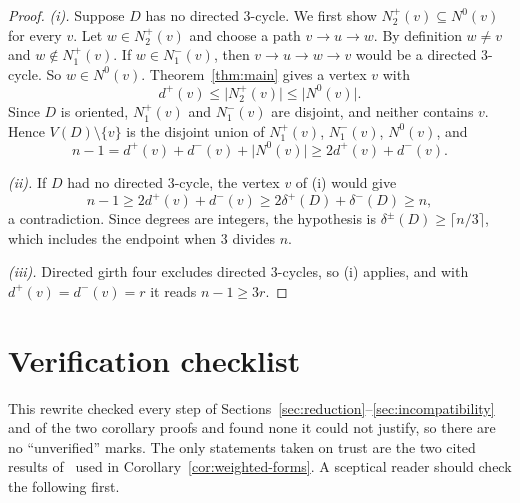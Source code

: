 \documentclass[11pt]{article}
\theoremstyle{remark}
\newcommand{\abs}[1]{\lvert #1\rvert}
\begin{document}
\begin{proof}
\emph{\textup{(i)}.} Suppose $D$ has no directed $3$-cycle. We first show
$N_2^+(v)\subseteq N^0(v)$ for every $v$. Let $w\in N_2^+(v)$ and choose a
path $v\to u\to w$. By definition $w\neq v$ and $w\notin N_1^+(v)$. If
$w\in N_1^-(v)$, then $v\to u\to w\to v$ would be a directed $3$-cycle. So
$w\in N^0(v)$. Theorem~\ref{thm:main} gives a vertex $v$ with
\[
 d^+(v)\leq\abs{N_2^+(v)}\leq\abs{N^0(v)}.
\]
Since $D$ is oriented, $N_1^+(v)$ and $N_1^-(v)$ are disjoint, and neither
contains $v$. Hence $V(D)\setminus\{v\}$ is the disjoint union of
$N_1^+(v)$, $N_1^-(v)$, $N^0(v)$, and
\[
 n-1=d^+(v)+d^-(v)+\abs{N^0(v)}
 \geq 2d^+(v)+d^-(v).
\]

\emph{\textup{(ii)}.} If $D$ had no directed $3$-cycle, the vertex $v$ of
\textup{(i)} would give
\[
 n-1\geq2d^+(v)+d^-(v)\geq2\delta^+(D)+\delta^-(D)\geq n,
\]
a contradiction. Since degrees are integers, the hypothesis is
$\delta^\pm(D)\geq\lceil n/3\rceil$, which includes the endpoint when $3$
divides $n$.

\emph{\textup{(iii)}.} Directed girth four excludes directed $3$-cycles, so
\textup{(i)} applies, and with $d^+(v)=d^-(v)=r$ it reads $n-1\geq3r$.
\end{proof}

\section{Verification checklist}\label{sec:checklist}

This rewrite checked every step of
Sections~\ref{sec:reduction}--\ref{sec:incompatibility} and of the two
corollary proofs and found none it could not justify, so there are no
``unverified'' marks. The only statements taken on trust are the two cited
results of~\cite{Seacrest2015} used in Corollary~\ref{cor:weighted-forms}.
A sceptical reader should check the following first.
\end{document}
